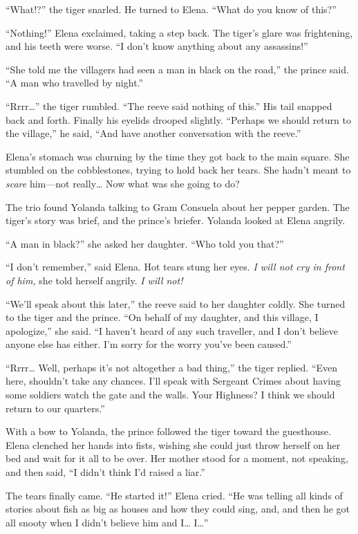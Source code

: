 \documentclass[10pt]{book}
\begin{document}
``What!?'' the tiger snarled. He turned to Elena. ``What do you know of this?''

``Nothing!'' Elena exclaimed, taking a step back. The tiger's glare was frightening, and his teeth were worse. ``I don't know anything about any assassins!''

``She told me the villagers had seen a man in black on the road,'' the prince said. ``A man who travelled by night.''

``Rrrr{\ldots}'' the tiger rumbled. ``The reeve said nothing of this.'' His tail snapped back and forth. Finally his eyelids drooped slightly. ``Perhaps we should return to the village,'' he said, ``And have another conversation with the reeve.''

Elena's stomach was churning by the time they got back to the main square. She stumbled on the cobblestones, trying to hold back her tears. She hadn't meant to \emph{scare} him---not really{\ldots} Now what was she going to do?

The trio found Yolanda talking to Gram Consuela about her pepper garden. The tiger's story was brief, and the prince's briefer. Yolanda looked at Elena angrily.

``A man in black?'' she asked her daughter. ``Who told you that?''

``I don't remember,'' said Elena. Hot tears stung her eyes. \emph{I will not cry in front of him,} she told herself angrily. \emph{I will not!}

``We'll speak about this later,'' the reeve said to her daughter coldly. She turned to the tiger and the prince. ``On behalf of my daughter, and this village, I apologize,'' she said. ``I haven't heard of any such traveller, and I don't believe anyone else has either. I'm sorry for the worry you've been caused.''

``Rrrr{\ldots} Well, perhaps it's not altogether a bad thing,'' the tiger replied. ``Even here, shouldn't take any chances. I'll speak with Sergeant Crimes about having some soldiers watch the gate and the walls. Your Highness? I think we should return to our quarters.''

With a bow to Yolanda, the prince followed the tiger toward the guesthouse. Elena clenched her hands into fists, wishing she could just throw herself on her bed and wait for it all to be over. Her mother stood for a moment, not speaking, and then said, ``I didn't think I'd raised a liar.''

The tears finally came. ``He started it!'' Elena cried. ``He was telling all kinds of stories about fish as big as houses and how they could sing, and, and then he got all snooty when I didn't believe him and I{\ldots} I{\ldots}''
\end{document}
